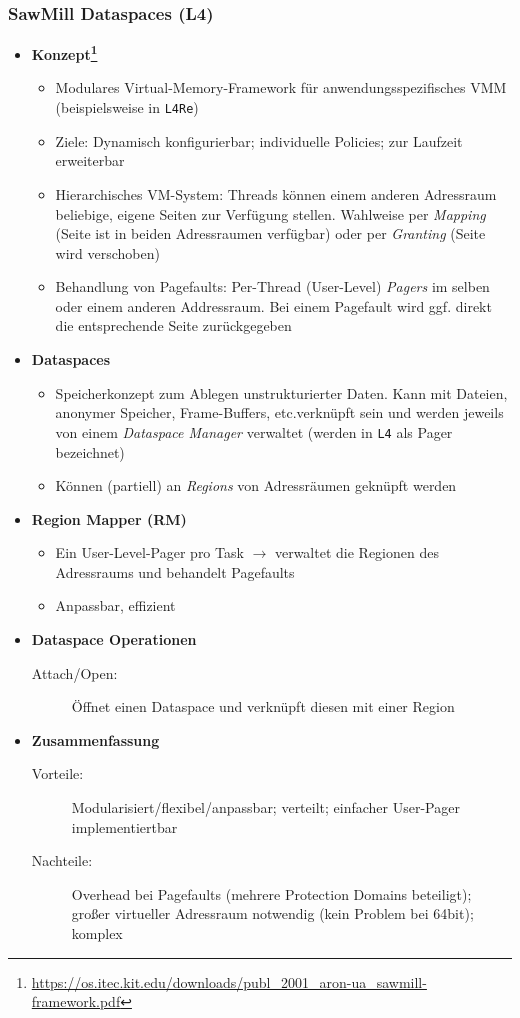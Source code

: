 \subsubsection{SawMill Dataspaces (L4)} %
\begin{itemize}
	\item \textbf{Konzept\footnote{\url{https://os.itec.kit.edu/downloads/publ_2001_aron-ua_sawmill-framework.pdf}}}
	\begin{itemize}
		\item Modulares Virtual-Memory-Framework für anwendungsspezifisches VMM (beispielsweise in \texttt{L4Re})
		\item Ziele: Dynamisch konfigurierbar; individuelle Policies; zur Laufzeit erweiterbar
		\item Hierarchisches VM-System: Threads können einem anderen Adressraum beliebige, eigene Seiten zur Verfügung stellen. Wahlweise per \textit{Mapping} (Seite ist in beiden Adressraumen verfügbar) oder per \textit{Granting} (Seite wird verschoben)
		\item Behandlung von Pagefaults: Per-Thread (User-Level) \textit{Pagers} im selben oder einem anderen Addressraum. Bei einem Pagefault wird ggf. direkt die entsprechende Seite zurückgegeben
	\end{itemize}
	\item \textbf{Dataspaces} %
	\begin{itemize}
		\item Speicherkonzept zum Ablegen unstrukturierter Daten. Kann mit Dateien, anonymer Speicher, Frame-Buffers, etc.verknüpft sein und werden jeweils von einem \textit{Dataspace Manager} verwaltet (werden in \texttt{L4} als Pager bezeichnet)
		\item Können (partiell) an \textit{Regions} von Adressräumen geknüpft werden
	\end{itemize}
	\item \textbf{Region Mapper (RM)}
	\begin{itemize}
		\item Ein User-Level-Pager pro Task \(\rightarrow\) verwaltet die Regionen des Adressraums und behandelt Pagefaults
		\item Anpassbar, effizient
	\end{itemize}
	\item \textbf{Dataspace Operationen}
	\begin{description}
		\item[Attach/Open:] Öffnet einen Dataspace und verknüpft diesen mit einer Region
	\end{description}
	\item \textbf{Zusammenfassung}
	\begin{description}
		\item[Vorteile:] Modularisiert/flexibel/anpassbar; verteilt; einfacher User-Pager implementiertbar
		\item[Nachteile:] Overhead bei Pagefaults (mehrere Protection Domains beteiligt); großer virtueller Adressraum notwendig (kein Problem bei 64bit); komplex
	\end{description}
\end{itemize}

